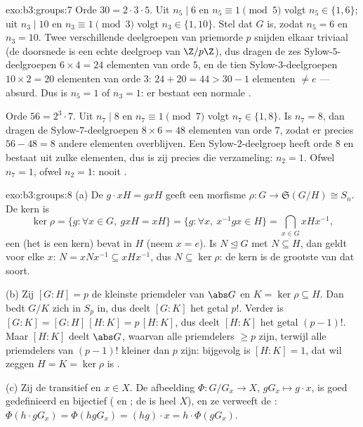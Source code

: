 \begin{solution}{exo:b3:groups:7}
Orde $30 = 2 \cdot 3 \cdot 5$. Uit $n_5 \mid 6$ en $n_5 \equiv 1
\pmod 5$ volgt $n_5 \in \{1, 6\}$; uit $n_3 \mid 10$ en $n_3 \equiv
1 \pmod 3$ volgt $n_3 \in \{1, 10\}$. Stel dat $G$  is,
zodat $n_5 = 6$ en $n_3 = 10$. Twee verschillende deelgroepen van
priemorde $p$ snijden elkaar triviaal (de doorsnede is een echte
deelgroep van $\Z/p\Z$), dus dragen de zes Sylow-$5$-deelgroepen $6
\times 4 = 24$ elementen van orde $5$, en de tien
Sylow-$3$-deelgroepen $10 \times 2 = 20$ elementen van orde $3$: $24
+ 20 = 44 > 30 - 1$ elementen $\neq e$ --- absurd. Dus is $n_5 = 1$
of $n_3 = 1$: er bestaat een normale .

Orde $56 = 2^3 \cdot 7$. Uit $n_7 \mid 8$ en $n_7 \equiv 1 \pmod 7$
volgt $n_7 \in \{1, 8\}$. Is $n_7 = 8$, dan dragen de
Sylow-$7$-deelgroepen $8 \times 6 = 48$ elementen van orde $7$,
zodat er precies $56 - 48 = 8$ andere elementen overblijven. Een
Sylow-$2$-deelgroep heeft orde $8$ en bestaat uit zulke elementen,
dus is zij precies die verzameling: $n_2 = 1$. Ofwel $n_7 = 1$,
ofwel $n_2 = 1$: nooit .
\end{solution}

\begin{solution}{exo:b3:groups:8}
(a) De  $g \cdot xH = gxH$ geeft een morfisme $\rho \colon G
\to \mathfrak S(G/H) \cong S_n$. De kern is
\[
\ker\rho = \{g : \forall x \in G,\ gxH = xH\}
= \{g : \forall x,\ x^{-1}gx \in H\}
= \bigcap_{x \in G} xHx^{-1},
\]
een  (het is een kern) bevat in $H$ (neem $x = e$). Is
$N \trianglelefteq G$ met $N \subseteq H$, dan geldt voor elke $x$:
$N = xNx^{-1} \subseteq xHx^{-1}$, dus $N \subseteq \ker\rho$: de
kern is de grootste van dat soort.

(b) Zij $[G:H] = p$ de kleinste priemdeler van $\abs G$ en $K =
\ker\rho \subseteq H$. Dan bedt $G/K$ zich in $S_p$ in, dus deelt
$[G:K]$ het getal $p!$. Verder is $[G:K] = [G:H]\,[H:K] =
p\,[H:K]$, dus deelt $[H:K]$ het getal $(p-1)!$. Maar $[H:K]$ deelt
$\abs G$, waarvan alle priemdelers $\geq p$ zijn, terwijl alle
priemdelers van $(p-1)!$ kleiner dan $p$ zijn: bijgevolg is $[H:K]
= 1$, dat wil zeggen $H = K = \ker \rho$ is .

(c) Zij de  transitief en $x \in X$. De afbeelding $\Phi
\colon G/G_x \to X$, $gG_x \mapsto g \cdot x$, is goed gedefinieerd
en bijectief ( en ; de  is heel $X$), en ze
verweeft de : $\Phi(h \cdot gG_x) = \Phi(hgG_x) = (hg)
\cdot x = h \cdot \Phi(gG_x)$.
\end{solution}


